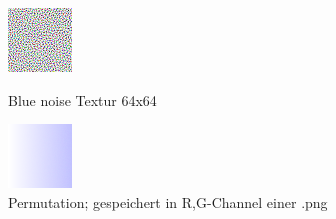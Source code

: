 \begin{figure}[H]\label{pic:Retargeting}
    \centering
    \begin{minipage}[t]{0.45\linewidth}
        \centering
        \includegraphics[interpolate=false,width=\linewidth]{content/simulatedAnnealing/Bilder/LDR_RGBA_64.png}
        \caption{Blue noise Textur 64x64}
    \end{minipage}
    \hfill
    \begin{minipage}[t]{0.45\linewidth}
        \centering
        \includegraphics[interpolate=false,width=\linewidth]{content/simulatedAnnealing/Bilder/retargeted_texture_10312_swaps.png}
        \caption{Permutation; gespeichert in R,G-Channel einer .png}
    \end{minipage}
\end{figure}


